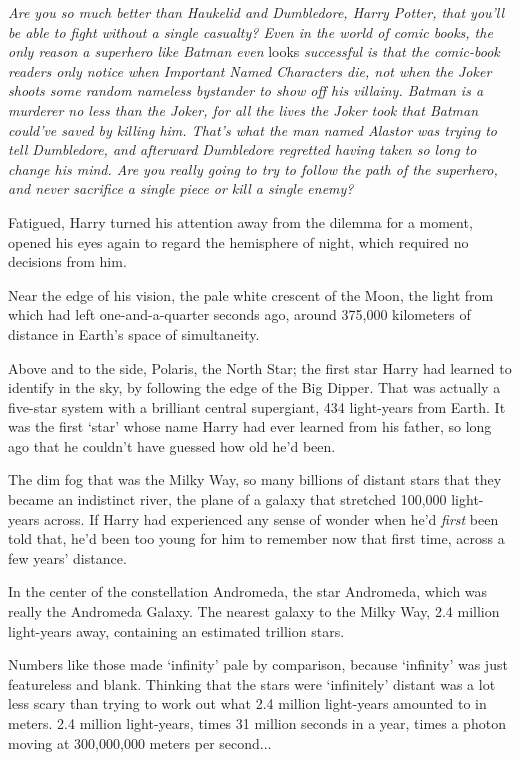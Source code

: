 \emph{Are you so much better than Haukelid and Dumbledore, Harry Potter,
that you'll be able to fight without a single casualty? Even in the
world of comic books, the only reason a superhero like Batman even}
looks \emph{successful is that the comic-book readers only notice when
Important Named Characters die, not when the Joker shoots some random
nameless bystander to show off his villainy. Batman is a murderer no
less than the Joker, for all the lives the Joker took that Batman
could've saved by killing him. That's what the man named Alastor was
trying to tell Dumbledore, and afterward Dumbledore regretted having
taken so long to change his mind. Are you really going to try to follow
the path of the superhero, and never sacrifice a single piece or kill a
single enemy?}

Fatigued, Harry turned his attention away from the dilemma for a moment,
opened his eyes again to regard the hemisphere of night, which required
no decisions from him.

Near the edge of his vision, the pale white crescent of the Moon, the
light from which had left one-and-a-quarter seconds ago, around 375,000
kilometers of distance in Earth's space of simultaneity.

Above and to the side, Polaris, the North Star; the first star Harry had
learned to identify in the sky, by following the edge of the Big Dipper.
That was actually a five-star system with a brilliant central
supergiant, 434 light-years from Earth. It was the first `star' whose
name Harry had ever learned from his father, so long ago that he
couldn't have guessed how old he'd been.

The dim fog that was the Milky Way, so many billions of distant stars
that they became an indistinct river, the plane of a galaxy that
stretched 100,000 light-years across. If Harry had experienced any sense
of wonder when he'd \emph{first} been told that, he'd been too young for
him to remember now that first time, across a few years' distance.

In the center of the constellation Andromeda, the star Andromeda, which
was really the Andromeda Galaxy. The nearest galaxy to the Milky Way,
2.4 million light-years away, containing an estimated trillion stars.

Numbers like those made `infinity' pale by comparison, because
`infinity' was just featureless and blank. Thinking that the stars were
`infinitely' distant was a lot less scary than trying to work out what
2.4 million light-years amounted to in meters. 2.4 million light-years,
times 31 million seconds in a year, times a photon moving at 300,000,000
meters per second...

